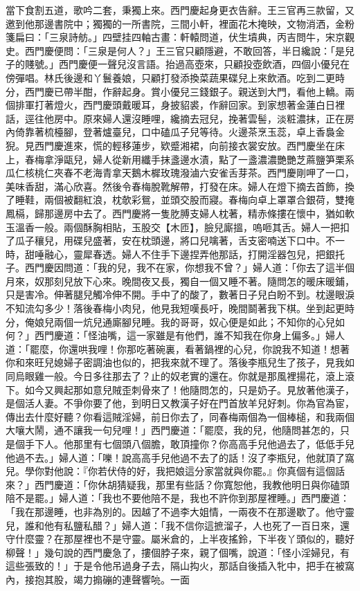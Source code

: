 \begin{showcontents}{}
當下食割五道，歌吟二套，秉獨上來。西門慶起身更衣告辭。王三官再三款留，又邀到他那邊書院中；獨獨的一所書院，三間小軒，裡面花木掩映，文物消洒，金粉箋扁曰：「三泉詩舫。」四壁挂四軸古畫：軒轅問道，伏生墳典，丙吉問牛，宋京觀史。西門慶便問：「三泉是何人？」王三官只顧隱避，不敢回答，半日纔說：「是兒子的賤號。」西門慶便一聲兒沒言語。抬過高壺來，只顧投壺飲酒，四個小優兒在傍彈唱。林氏後邊和丫鬟養娘，只顧打發添換菜蔬果碟兒上來飲酒。吃到二更時分，西門慶已帶半酣，作辭起身。賞小優兒三錢銀子。親送到大門，看他上轎。兩個排軍打著燈火，西門慶頭戴暖耳，身披貂裘，作辭回家。到家想著金蓮白日裡話，逕往他房中。原來婦人還沒睡哩，纔摘去冠兒，挽著雲髻，淡粧濃抹，正在房內倚靠著梳檯腳，登著爐臺兒，口中磕瓜子兒等待。火邊茶烹玉蕊，卓上香裊金猊。見西門慶進來，慌的輕移蓮步，欵蹙湘裙，向前接衣裳安放。西門慶坐在床上，春梅拿淨甌兒，婦人從新用纖手抹盞邊水漬，點了一盞濃濃艷艷芝蔴鹽笋栗系瓜仁核桃仁夾春不老海青拿天鵝木樨玫瑰潑滷六安雀舌芽茶。西門慶剛呷了一口，美味香甜，滿心欣喜。然後令春梅脫靴解帶，打發在床。婦人在燈下摘去首飾，換了睡鞋，兩個被翻紅浪，枕欹彩鴛，並頭交股而寢。春梅向卓上罩罩合銀荷，雙掩鳳槅，歸那邊房中去了。西門慶將一隻肐膊支婦人枕著，精赤條摟在懷中，猶如軟玉溫香一般。兩個酥胸相貼，玉股交【木匝】，臉兒廝搵，嗚咂其舌。婦人一把扣了瓜子穰兒，用碟兒盛著，安在枕頭邊，將口兒噙著，舌支密喃送下口中。不一時，甜唾融心，靈犀春透。婦人不住手下邊捏弄他那話，打開淫器包兒，把銀托子。西門慶因問道：「我的兒，我不在家，你想我不曾？」婦人道：「你去了這半個月來，奴那刻兒放下心來。晚間夜又長，獨自一個又睡不著。隨問怎的暖床暖鋪，只是害冷。伸著腿兒觸冷伸不開。手中了的酸了，數著日子兒白盼不到。枕邊眼淚不知流勾多少！落後春梅小肉兒，他見我短嘆長吁，晚間鬬著我下棋。坐到起更時分，俺娘兒兩個一炕兒通廝腳兒睡。我的哥哥，奴心便是如此；不知你的心兒如何？」西門慶道：「怪油嘴，這一家雖是有他們，誰不知我在你身上偏多。」婦人道：「罷麼，你還哄我哩！你那吃著碗裏，看著鍋裡的心兒，你說我不知道！想著你和來旺兒媳婦子密調油也似的，把我來就不理了。落後李瓶兒生了孩子，見我如同烏眼雞一般。今日多往那去了？止的奴老實的還在。你就是那風裡揚花，滾上滾下。如今又興起那如意兒賊歪刺骨來了！他隨問怎的，只是奶子。見放著他漢子，是個活人妻。不爭你要了他，到明日又教漢子好在門首放羊兒好刺。你為官為宦，傳出去什麼好聽？你看這賊淫婦，前日你去了，同春梅兩個為一個棒槌，和我兩個大嚷大鬧，通不讓我一句兒哩！」西門慶道：「罷麼，我的兒，他隨問甚怎的，只是個手下人。他那里有七個頭八個膽，敢頂撞你？你高高手兒他過去了，低低手兒他過不去。」婦人道：「嚛！說高高手兒他過不去了的話！沒了李瓶兒，他就頂了窩兒。學你對他說：『你若伏侍的好，我把娘這分家當就與你罷。』你真個有這個話來？」西門慶道：「你休胡猜疑我，那里有些話？你寬恕他，我教他明日與你磕頭陪不是罷。」婦人道：「我也不要他陪不是，我也不許你到那屋裡睡。」西門慶道：「我在那邊睡，也非為別的。因越了不過李大姐情，一兩夜不在那邊歇了。他守靈兒，誰和他有私鹽私醋？」婦人道：「我不信你這摭溜子，人也死了一百日來，還守什麼靈？在那屋裡也不是守靈。屬米倉的，上半夜搖鈴，下半夜丫頭似的，聽好柳聲！」幾句說的西門慶急了，摟個脖子來，親了個嘴，說道：「怪小淫婦兒，有這些張致的！」于是令他吊過身子去，隔山抅火，那話自後插入牝中，把手在被窩內，接抱其股，竭力搧磞的連聲響喨。一面
\end{showcontents}
